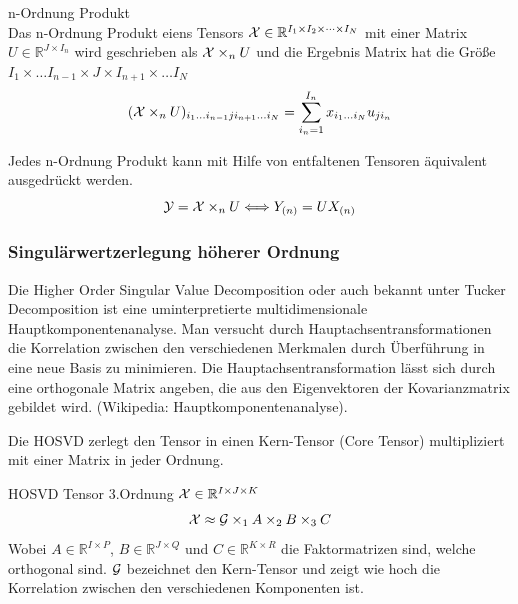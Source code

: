 \begin{Definition} n-Ordnung Produkt \\
Das n-Ordnung Produkt eiens Tensors  ${\cal X}  \in \mathbb{R}^{I_1 \times I_2 \times \dots \times I_N}$ mit einer Matrix $U \in \mathbb{R}^{J \times I_n}$ wird geschrieben als ${\cal X} \times_n U$ und die Ergebnis Matrix hat die Größe $I_1 \times \dots I_{n-1} \times J \times I_{n+1} \times \dots I_N$
\begin{equation}
	({\cal X} \times_n U)_{i_1 \dots i_{n-1} j i_{n+1} \dots i_N} = \sum_{i_n = 1}^{I_n} x_{i_1 \dots i_N} u_{j i_n}
\end{equation}
\end{Definition}

\begin{Bemerkung}
Jedes n-Ordnung Produkt kann mit Hilfe von entfaltenen Tensoren äquivalent ausgedrückt werden.
\begin{equation}
{\cal Y} = {\cal X} \times_n U \Longleftrightarrow Y_{(n)} = UX_{(n)}
\end{equation}
\end{Bemerkung}

\subsubsection{Singulärwertzerlegung höherer Ordnung}

Die Higher Order Singular Value Decomposition oder auch bekannt unter Tucker Decomposition ist eine uminterpretierte multidimensionale Hauptkomponentenanalyse. Man versucht durch Hauptachsentransformationen die Korrelation zwischen den verschiedenen Merkmalen durch Überführung in eine neue Basis zu minimieren. Die Hauptachsentransformation lässt sich durch eine orthogonale Matrix angeben, die aus den Eigenvektoren der Kovarianzmatrix gebildet wird. (Wikipedia: Hauptkomponentenanalyse).

Die HOSVD zerlegt den Tensor in einen Kern-Tensor (Core Tensor) multipliziert mit einer Matrix in jeder Ordnung. 

\begin{Beispiel} HOSVD Tensor 3.Ordnung
${\cal X}  \in \mathbb{R}^{I \times J \times K}$
\begin{equation}
{\cal X} \approx {\cal G} \times_1 A \times_2 B \times_3 C 
\end{equation}
Wobei $A \in \mathbb{R}^{I \times P}$, $B \in \mathbb{R}^{J \times Q}$ und $C \in \mathbb{R}^{K \times R}$ die Faktormatrizen sind, welche orthogonal sind.
${\cal G}$ bezeichnet den Kern-Tensor und zeigt wie hoch die Korrelation zwischen den verschiedenen Komponenten ist.
\end{Beispiel}

